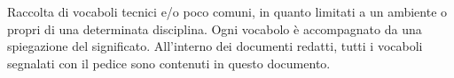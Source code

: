 Raccolta di vocaboli tecnici e/o poco comuni, in quanto limitati a un ambiente o propri di una determinata disciplina. Ogni vocabolo è accompagnato da una spiegazione del significato. All'interno dei documenti redatti, tutti i vocaboli segnalati con il pedice  sono contenuti in questo documento.
